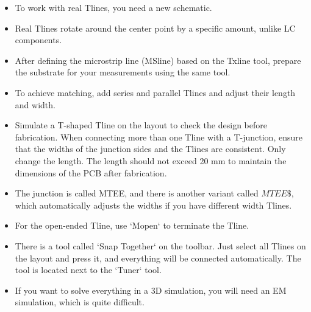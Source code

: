 \documentclass{article}
\begin{document}
\begin{itemize}
    \item To work with real Tlines, you need a new schematic.
    \item Real Tlines rotate around the center point by a specific amount, unlike LC components.
    \item After defining the microstrip line (MSline) based on the Txline tool, prepare the substrate for your measurements using the same tool.
    \item To achieve matching, add series and parallel Tlines and adjust their length and width.
    \item Simulate a T-shaped Tline on the layout to check the design before fabrication. When connecting more than one Tline with a T-junction, ensure that the widths of the junction sides and the Tlines are consistent. Only change the length. The length should not exceed 20 mm to maintain the dimensions of the PCB after fabrication.
    \item The junction is called MTEE, and there is another variant called $MTEE\$$, which automatically adjusts the widths if you have different width Tlines.
    \item For the open-ended Tline, use `Mopen` to terminate the Tline.
    \item There is a tool called `Snap Together` on the toolbar. Just select all Tlines on the layout and press it, and everything will be connected automatically. The tool is located next to the `Tuner` tool.
    \item If you want to solve everything in a 3D simulation, you will need an EM simulation, which is quite difficult.
\end{itemize}
\end{document}
